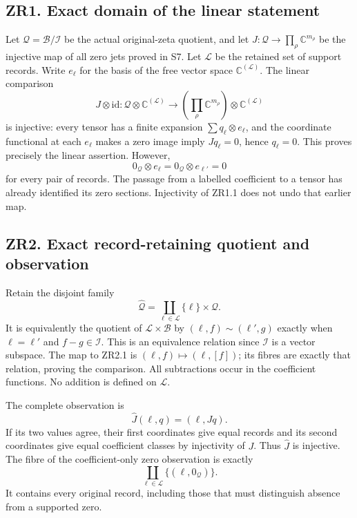 \documentclass[
]{article}
\begin{document}
\subsection{ZR1. Exact domain of the linear
statement}\label{zr1.-exact-domain-of-the-linear-statement}

Let \(\mathcal Q=\mathcal B/\mathcal I\) be the actual original-zeta
quotient, and let \(J:\mathcal Q\to\prod_\rho\mathbb C^{m_\rho}\) be the
injective map of all zero jets proved in S7. Let \(\mathcal L\) be the
retained set of support records. Write \(e_\ell\) for the basis of the
free vector space \(\mathbb C^{(\mathcal L)}\). The linear comparison \[
J\otimes\mathrm{id}:\mathcal Q\otimes\mathbb C^{(\mathcal L)}
\longrightarrow (\prod_\rho\mathbb C^{m_\rho})\otimes\mathbb C^{(\mathcal L)}
\tag{ZR1.1}
\] is injective: every tensor has a finite expansion
\(\sum q_\ell\otimes e_\ell\), and the coordinate functional at each
\(e_\ell\) makes a zero image imply \(Jq_\ell=0\), hence \(q_\ell=0\).
This proves precisely the linear assertion. However, \[
0_{\mathcal Q}\otimes e_\ell=0_{\mathcal Q}\otimes e_{\ell'}=0
\tag{ZR1.2}
\] for every pair of records. The passage from a labelled coefficient to
a tensor has already identified its zero sections. Injectivity of ZR1.1
does not undo that earlier map.

\subsection{ZR2. Exact record-retaining quotient and
observation}\label{zr2.-exact-record-retaining-quotient-and-observation}

Retain the disjoint family \[
\widehat{\mathcal Q}=\coprod_{\ell\in\mathcal L}\{\ell\}\times\mathcal Q.
\tag{ZR2.1}
\] It is equivalently the quotient of \(\mathcal L\times\mathcal B\) by
\((\ell,f)\sim(\ell',g)\) exactly when \(\ell=\ell'\) and
\(f-g\in\mathcal I\). This is an equivalence relation since
\(\mathcal I\) is a vector subspace. The map to ZR2.1 is
\((\ell,f)\mapsto(\ell,[f])\); its fibres are exactly that relation,
proving the comparison. All subtractions occur in the coefficient
functions. No addition is defined on \(\mathcal L\).

The complete observation is \[
\widehat J(\ell,q)=(\ell,Jq).
\tag{ZR2.2}
\] If its two values agree, their first coordinates give equal records
and its second coordinates give equal coefficient classes by injectivity
of \(J\). Thus \(\widehat J\) is injective. The fibre of the
coefficient-only zero observation is exactly \[
\coprod_{\ell\in\mathcal L}\{(\ell,0_{\mathcal Q})\}.
\tag{ZR2.3}
\] It contains every original record, including those that must
distinguish absence from a supported zero.
\end{document}
